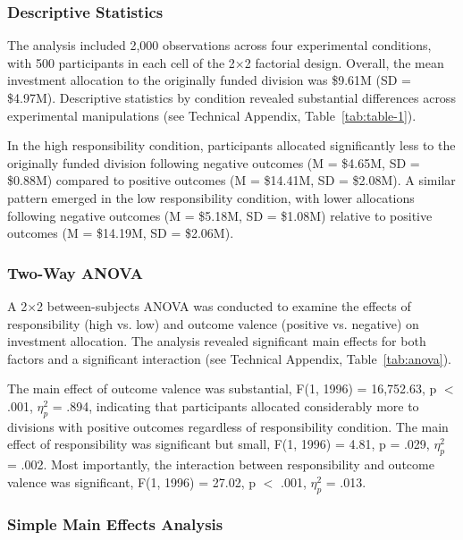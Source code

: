 \documentclass[letterpaper]{article} %
\begin{document}

\subsubsection{Descriptive Statistics}

The analysis included 2,000 observations across four experimental conditions, with 500 participants in each cell of the 2×2 factorial design. Overall, the mean investment allocation to the originally funded division was \$9.61M (SD = \$4.97M). Descriptive statistics by condition revealed substantial differences across experimental manipulations (see Technical Appendix, Table~\ref{tab:table-1}).

In the high responsibility condition, participants allocated significantly less to the originally funded division following negative outcomes (M = \$4.65M, SD = \$0.88M) compared to positive outcomes (M = \$14.41M, SD = \$2.08M). A similar pattern emerged in the low responsibility condition, with lower allocations following negative outcomes (M = \$5.18M, SD = \$1.08M) relative to positive outcomes (M = \$14.19M, SD = \$2.06M).

\subsubsection{Two-Way ANOVA}

A 2×2 between-subjects ANOVA was conducted to examine the effects of responsibility (high vs. low) and outcome valence (positive vs. negative) on investment allocation. The analysis revealed significant main effects for both factors and a significant interaction (see Technical Appendix, Table~\ref{tab:anova}).

The main effect of outcome valence was substantial, F(1, 1996) = 16,752.63, p $<$ .001, $\eta_p^2$ = .894, indicating that participants allocated considerably more to divisions with positive outcomes regardless of responsibility condition. The main effect of responsibility was significant but small, F(1, 1996) = 4.81, p = .029, $\eta_p^2$ = .002. Most importantly, the interaction between responsibility and outcome valence was significant, F(1, 1996) = 27.02, p $<$ .001, $\eta_p^2$ = .013.

\subsubsection{Simple Main Effects Analysis}
\end{document}
